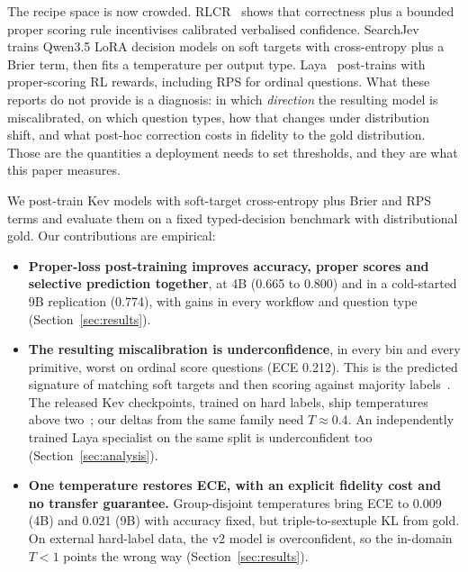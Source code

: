 \documentclass{article}
\begin{document}
The recipe space is now crowded. RLCR~\cite{damani2025rlcr} shows that
correctness plus a bounded proper scoring rule incentivises calibrated
verbalised confidence. SearchJev~\cite{cao2026searchjev} trains Qwen3.5
LoRA decision models on soft targets with cross-entropy plus a Brier term,
then fits a temperature per output type. Laya~\cite{laya2026} post-trains
with proper-scoring RL rewards, including RPS for ordinal questions. What
these reports do not provide is a diagnosis: in which \emph{direction} the
resulting model is miscalibrated, on which question types, how that changes
under distribution shift, and what post-hoc correction costs in fidelity to
the gold distribution. Those are the quantities a deployment needs to set
thresholds, and they are what this paper measures.

We post-train Kev models with soft-target cross-entropy plus Brier and RPS
terms and evaluate them on a fixed typed-decision benchmark with
distributional gold. Our contributions are empirical:
\begin{itemize}
\item \textbf{Proper-loss post-training improves accuracy, proper scores and
selective prediction together}, at 4B (0.665 to 0.800) and in a
cold-started 9B replication (0.774), with gains in every workflow and
question type (Section~\ref{sec:results}).
\item \textbf{The resulting miscalibration is underconfidence}, in every
bin and every primitive, worst on ordinal score questions (ECE 0.212). This
is the predicted signature of matching soft targets and then scoring
against majority labels~\cite{baan2022stop,kohli2026saturation}. The
released Kev checkpoints, trained on hard labels, ship temperatures above
two~\cite{kev2026}; our deltas from the same family need $T\approx0.4$. An
independently trained Laya specialist on the same split is
underconfident too (Section~\ref{sec:analysis}).
\item \textbf{One temperature restores ECE, with an explicit fidelity
cost and no transfer guarantee.} Group-disjoint temperatures bring ECE to
0.009 (4B) and 0.021 (9B) with accuracy fixed, but triple-to-sextuple KL
from gold. On external hard-label data, the v2 model is overconfident, so
the in-domain $T<1$ points the wrong way (Section~\ref{sec:results}).
\end{itemize}
\end{document}
